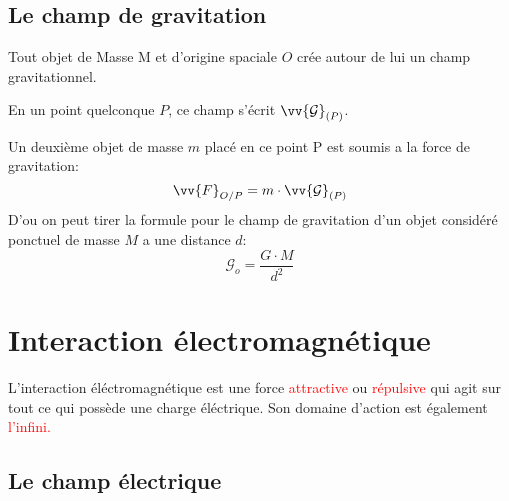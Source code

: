 \documentclass[main.tex]{subfiles}
\begin{document}
\subsection{Le champ de gravitation}

\begin{Definition}
    Tout objet de Masse M et d'origine spaciale $O$ crée autour de lui un champ gravitationnel.

    En un point quelconque $P$, ce champ s'écrit $\vv{\mathcal{G}}_{(P)}$.

    Un deuxième objet de masse $m$ placé en ce point P est soumis a la force de gravitation:
    $$\vv{F}_{O/P} = m \cdot \vv{\mathcal{G}}_{(P)} $$
    D'ou on peut tirer la formule pour le champ de gravitation d'un objet considéré ponctuel de masse $M$ a une distance $d$:
    $${\mathcal{G}}_{o} = \dfrac{G\cdot M}{d^2} $$
\end{Definition}


\section{Interaction électromagnétique}

\begin{Definition}
    L'interaction éléctromagnétique est une force \textcolor{red}{attractive} ou \textcolor{red}{répulsive} qui agit sur tout ce qui possède une charge éléctrique. Son domaine d'action est également \textcolor{red}{l'infini.}
\end{Definition}

\subsection{Le champ électrique}
\end{document}
